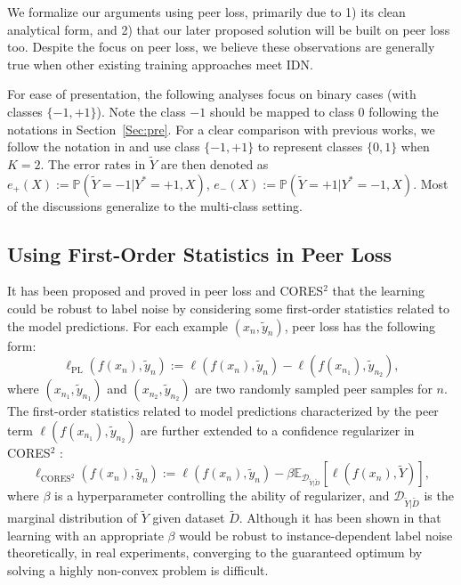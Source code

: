 \documentclass[final]{cvpr}
\newcommand{\PP}{\mathbb P}
\newcommand{\E}{\mathbb E}
\begin{document}
 We formalize our arguments using peer loss, primarily due to 1) its clean analytical form, and 2) that our later proposed solution will be built on peer loss too. Despite the focus on peer loss, we believe these observations are generally true when other existing training approaches meet IDN. 

For ease of presentation, the following analyses focus on binary cases (with classes $\{-1,+1\}$).
Note the class $-1$ should be mapped to class $0$ following the notations in Section~\ref{Sec:pre}. 
For a clear comparison with previous works, we follow the notation in \cite{liu2019peer} and use class $\{-1,+1\}$ to represent classes $\{0,1\}$ when $K=2$.
The error rates in $\widetilde Y$ are then denoted as $e_+(X):=\PP(\widetilde Y = -1|Y^*=+1,X)$, $e_-(X):=\PP(\widetilde Y = +1|Y^*=-1,X)$. Most of the discussions generalize to the multi-class setting. 
 
\subsection{Using First-Order Statistics in Peer Loss}\label{sec:first-order-info}

It has been proposed and proved in peer loss \cite{liu2019peer} and CORES$^2$ \cite{sieve2020} that the learning could be robust to label noise by considering some first-order statistics related to the model predictions.
For each example $(x_n,\tilde y_n)$, peer loss \cite{liu2019peer} has the following form:
\[
\ell_{\text{PL}}(f(x_n),\tilde y_{n}) := \ell(f(x_n),\tilde y_n) - \ell(f(x_{n_1}),\tilde y_{n_2}),
\]
where $(x_{n_1},\tilde y_{n_1})$ and $(x_{n_2},\tilde y_{n_2})$ are two randomly sampled peer samples for $n$.
The first-order statistics related to model predictions characterized by the peer term $ \ell(f(x_{n_1}),\tilde y_{n_2})$ are further extended to a confidence regularizer in CORES$^2$ \cite{sieve2020}:
\[
  \ell_{\text{CORES}^2}(f(x_n),\tilde y_{n}) :=    \ell(f(x_n),\tilde y_{n}) - \beta \E_{\mathcal{D}_{\widetilde{Y}|\widetilde{D}}}[\ell(f(x_n),\widetilde Y)],
\]
where $\beta$ is a hyperparameter controlling the ability of regularizer, and {\small $\mathcal{D}_{\widetilde{Y}|\widetilde{D}}$} is the marginal distribution of {\small $\widetilde Y$} given dataset {\small $\widetilde D$}.
Although it has been shown in \cite{sieve2020} that learning with an appropriate $\beta$ would be robust to instance-dependent label noise theoretically, in real experiments, converging to the guaranteed optimum by solving a highly non-convex problem is difficult.
\end{document}
